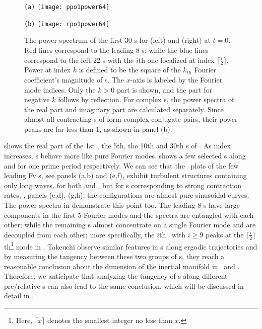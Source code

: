 \begin{figure}[h]
  \centering
  \begin{minipage}{.47\textwidth}
    \centering \small{\texttt{(a)}}
    \texttt{[image: ppo1power64]}
  \end{minipage}
  \begin{minipage}{.47\textwidth}
    \centering \small{\texttt{(b)}}
    \texttt{[image: rpo1power64]}
  \end{minipage}
  \caption[The power spectrum of the first 30 \Fv s for  and .]{
    The power spectrum of the first 30 \Fv s for 
    (left) and  (right)
    at $t=0$. Red lines correspond to the leading 8 \Fv s; while
    the blue lines correspond to the left 22 \Fv s with the $i${th} one
    localized at index $\lceil \frac{i}{2} \rceil$.
    Power at index $k$ is defined to be the square of the $k_{th}$
    Fourier coefficient's magnitude
    of \Fv s.
    The $x$-axis is
    labeled by the Fourier mode indices.
    Only the $k>0$ part is shown, and the part for
    negative $k$ follows by reflection. For complex \Fv s, the
    power spectra of the real part and imaginary part are calculated
    separately. Since almost all contracting \Fv s of 
    form complex conjugate pairs, their power peaks are far less than 1,
    as shown in panel (b).
  }
  \label{fig:FVpower}
\end{figure}

 shows the real part of the 1st \Fv, the 5th,
the 10th and 30th \Fv s of . As index increases, \Fv s behave more
like pure Fourier modes.
 shows a few selected \Fv s along 
and  for one prime period respectively.
We can see that the \spt\ plots of the few leading
Fv s, see panels (a,b) and (e,f), exhibit turbulent structures containing only long waves,
for both  and ,
but for
\Fv s corresponding to strong contraction rates, \ie, panels (c,d), (g,h),
the configurations
are almost pure sinusoidal curves. The power spectra in 
demonstrate this point too. The leading 8 \Fv s have large components in
the first 5 Fourier modes and the spectra are entangled with each other;
while the remaining \Fv s almost concentrate
on a single Fourier mode and are decoupled from each other;
more specifically, the $i$th \Fv\ with $i\ge 9$
peaks at the $\lceil \frac{i}{2} \rceil$th\footnote{{
Here, $\lceil x \rceil$ denotes the smallest integer no less than $x$. }}
mode in .
Takeuchi {\etal} observe similar
features in \cLv s along ergodic
trajectories and by measuring the tangency between these two groups of
\cLv s, they reach a reasonable conclusion about the dimension of
the inertial manifold in \KSe\ and \cGLe.
Therefore, we anticipate that analyzing the tangency of \Fv s along
different pre/relative \po s can also lead to the same conclusion, which
will be discussed in detail in .

